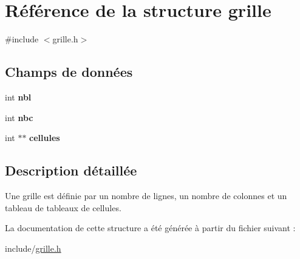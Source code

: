 \hypertarget{structgrille}{}\section{Référence de la structure grille}
\label{structgrille}


{\ttfamily \#include $<$grille.\+h$>$}

\subsection*{Champs de données}
\begin{DoxyCompactItemize}
\item 
\mbox{\label{structgrille_acf98b2c5c1a51e021aad6633fd2c41c6}} 
int {\bfseries nbl}
\item 
\mbox{\label{structgrille_a965672cdeaba5c5352e804c1ac4bdb91}} 
int {\bfseries nbc}
\item 
\mbox{\label{structgrille_a008dfdfef8fc75a738819f5329ee57a7}} 
int $\ast$$\ast$ {\bfseries cellules}
\end{DoxyCompactItemize}


\subsection{Description détaillée}
Une grille est définie par un nombre de lignes, un nombre de colonnes et un tableau de tableaux de cellules. 

La documentation de cette structure a été générée à partir du fichier suivant \+:\begin{DoxyCompactItemize}
\item 
include/\hyperlink{grille_8h}{grille.\+h}\end{DoxyCompactItemize}
